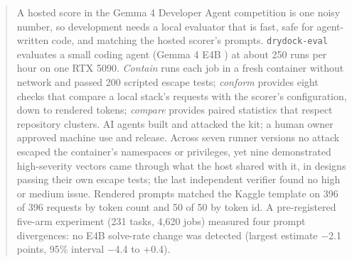 \begin{abstract}
A hosted score in the Gemma 4 Developer Agent competition \cite{r1} is one noisy number, so development needs a local evaluator that is fast, safe for agent-written code, and matching the hosted scorer's prompts. \texttt{drydock-eval} evaluates a small coding agent (Gemma 4 E4B \cite{r2}) at about 250 runs per hour on one RTX 5090. \emph{Contain} runs each job in a fresh container without network and passed 200 scripted escape tests; \emph{conform} provides eight checks that compare a local stack's requests with the scorer's configuration, down to rendered tokens; \emph{compare} provides paired statistics that respect repository clusters. AI agents built and attacked the kit; a human owner approved machine use and release. Across seven runner versions no attack escaped the container's namespaces or privileges, yet nine demonstrated high-severity vectors came through what the host shared with it, in designs passing their own escape tests; the last independent verifier found no high or medium issue. Rendered prompts matched the Kaggle template on 396 of 396 requests by token count and 50 of 50 by token id. A pre-registered five-arm experiment (231 tasks, 4,620 jobs) measured four prompt divergences: no E4B solve-rate change was detected (largest estimate \ensuremath{-}2.1 points, 95\% interval \ensuremath{-}4.4 to +0.4).
\end{abstract}
